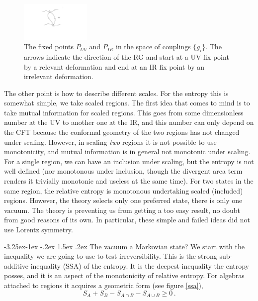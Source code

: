 \documentclass[11pt]{article}
\makeatletter
\renewcommand\subsection{\@startsection{subsection}{2}{\z@}%
                                   {-3.25ex\@plus -1ex \@minus -.2ex}%
                                     {1.5ex \@plus .2ex}%
                                     {\normalfont\bfseries}}
\numberwithin{equation}{section}
\newcommand{\be}{\begin{equation}}
\newcommand{\ee}{\end{equation}}
\makeatother
\begin{document}
\begin{figure}[t]
\begin{center}  
\includegraphics[width=0.3\textwidth]{rg.pdf}
\captionsetup{width=0.9\textwidth}
\caption{The fixed points $P_{UV}$ and $P_{IR}$ in the space of couplings $\{g_i\}$. The arrows indicate the direction of the RG and start at a UV fix point by a relevant deformation and end at an IR fix point by an irrelevant deformation.}
\label{rg}
\end{center}  
\end{figure}

The other point is how to describe different scales. For the entropy this is somewhat simple, we take scaled regions. The first idea that comes to mind is to take mutual information for scaled regions. This goes from some dimensionless number at the UV to another one at the IR, and this number can only depend on the CFT because the conformal geometry of the two regions has not changed under scaling. However, in scaling {\sl two} regions it is not possible to use monotonicity, and mutual information is in general not monotonic under scaling. For a single region, we can have an inclusion under scaling, but the entropy is not well defined (nor monotonous under inclusion, though the divergent area term renders it trivially monotonic and useless at the same time). For two states in the same region, the relative entropy is monotonous undertaking scaled (included) regions. However, the theory selects only one preferred state, there is only one vacuum. The theory is preventing us from getting a too easy result, no doubt from good reasons of its own. In particular, these simple and failed ideas did not use Lorentz symmetry.     

\subsection{The vacuum a Markovian state?}
We start with the inequality we are going to use to test irreversibility. This is the strong sub-additive inequality (SSA) of the entropy. It is the deepest inequality the entropy posses, and it is an aspect of the monotonicity of relative entropy. For algebras attached to regions it acquires a geometric form (see figure \ref{ssa}),
\be\label{markov0}
S_A+S_B-S_{A\cap B}-S_{A\cup B}\ge 0\,. 
\ee
\end{document}
